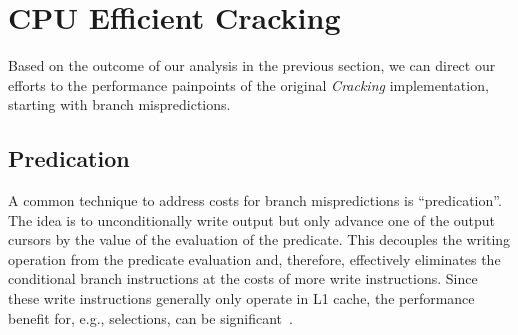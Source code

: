 \section{CPU Efficient Cracking}
\label{sec:cracking-algorithms}
Based on the outcome of our analysis in the previous section, we can
direct our efforts to the performance painpoints of the original
\emph{Cracking} implementation, starting with branch mispredictions.

\subsection*{Predication}
\label{sec:predication}
A common technique to address costs for branch mispredictions is
``predication''. The idea is to unconditionally write output but only
advance one of the output cursors by the value of the evaluation of
the predicate. This decouples the writing operation from the predicate
evaluation and, therefore, effectively eliminates the conditional
branch instructions at the costs of more write instructions. Since
these write instructions generally only operate in L1 cache, the
performance benefit for, e.g., selections, can be
significant~\cite{ross2004selection}.

